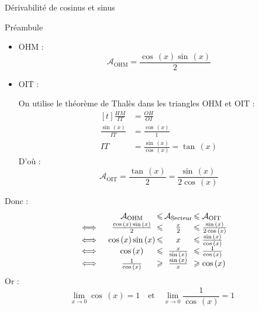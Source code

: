 \documentclass{coursbook}
\begin{document}
\begin{Gpartie}{Dérivabilité de cosinus et sinus}
\begin{Spartie}{Préambule}
\begin{itemize}
                \item $\mathrm{OHM}$ : \[\mathcal{A}_\mathrm{OHM}=\frac{\cos\,(x)\sin\,(x)}{2}\]

                \item $\mathrm{OIT}$ :
                
                On utilise le théorème de Thalès dans les triangles $\mathrm{OHM}$ et $\mathrm{OIT}$ : 
                \[\begin{aligned}[t]
                    \frac{HM}{IT} &= \frac{OH}{OI} \\[1.5ex]
                    \frac{\sin\,(x)}{IT} &=\frac{\cos\,(x)}{1} \\[1.5ex]
                    IT &= \frac{\sin\,(x)}{\cos\,(x)}=\tan\,(x)
                \end{aligned}\]
                D'où :  \[\mathcal{A}_\mathrm{OIT}=\frac{\tan\,(x)}{2}=\frac{\sin\,(x)}{2\cos\,(x)}\]
            \end{itemize}
        
            \renewcommand*{\arraystretch}{2} %

            Donc :~
            \[\begin{array}{ r@{\,} c@{\,} c@{\,} c@{\,} l@{\,} }
                    &\quad\mathcal{A}_\mathrm{OHM}  & \leq & \mathcal{A}_\text{Secteur} & \leq\mathcal{A}_\mathrm{OIT} \\
                \iff&\quad\frac{\cos\,(x)\sin\,(x)}{2}  & \leq & \frac{x}{2}                & \leq\frac{\sin\,(x)}{2\cos\,(x)} \\
                \iff&\quad\cos\,(x)\sin\,(x)            & \leq & x                          & \leq\frac{\sin\,(x)}{\cos\,(x)} \\
                \iff&\quad\cos\,(x)                   & \leq & \frac{x}{\sin\,(x)}          & \leq\frac{1}{\cos\,(x)} \\
                \iff&\quad\frac{1}{\cos\,(x)}         & \geq & \frac{\sin\,(x)}{x}          & \geq\cos\,(x) 
            \end{array}\]
            Or : \[\lim\limits_{x\to0}\cos\,(x)=1\quad\text{et}\quad\lim\limits_{x\to0}\frac{1}{\cos\,(x)}=1\]


\end{Spartie}
\end{Gpartie}
\end{document}
